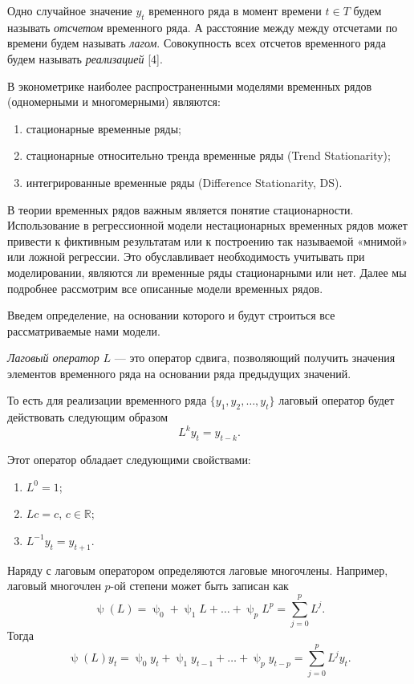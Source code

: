 \documentclass[a4paper, 14pt]{extreport}
\numberwithin{equation}{subsection}
\newcommand{\Rm}{\mathbb{R}}
\renewcommand{\psi}{\uppsi}
\numberwithin{equation}{section}
\begin{document}
	Одно случайное значение $y_t$ временного ряда в момент времени $t \in T$ будем называть \textit{отсчетом} временного ряда. А расстояние между между отсчетами по времени будем называть \textit{лагом}. Совокупность всех отсчетов временного ряда будем называть \textit{реализацией} [4].
	
	В эконометрике наиболее распространенными моделями временных рядов (одномерными и многомерными) являются:
	\begin{enumerate}
		\item стационарные временные ряды;
		\item стационарные относительно тренда временные ряды (Trend Stationarity);
		\item интегрированные временные ряды (Difference Stationarity, DS).
	\end{enumerate}
	
	В теории временных рядов важным является понятие стационарности. Использование в регрессионной модели нестационарных временных рядов
	может привести к фиктивным результатам или к построению так называемой
	«мнимой» или ложной регрессии. Это обуславливает
	необходимость учитывать при моделировании, являются ли временные ряды
	стационарными или нет. Далее мы подробнее рассмотрим все описанные модели временных рядов.
	
	Введем определение, на основании которого и будут строиться все рассматриваемые нами модели.
	
	\textit{Лаговый оператор}  $L$ --- это оператор сдвига, позволяющий получить значения элементов временного ряда на основании ряда предыдущих значений.
	
	То есть для реализации временного ряда $\{y_1, y_2,\ldots, y_t\}$ лаговый оператор будет действовать следующим образом 
	\begin{equation}
		L^k y_t = y_{t-k}.
	\end{equation}
	
	Этот оператор обладает следующими свойствами:
	\begin{enumerate}
		\item $L^0 = 1$;
		\item $Lc = c$, $c \in \Rm$;
		\item $L^{-1} y_t = y_{t+1}$.
	\end{enumerate}
	
	Наряду с лаговым оператором определяются лаговые многочлены. Например, лаговый многочлен $p$-ой степени может быть записан как
	\begin{equation}
		\psi(L) = \psi_0 + \psi_1 L + \ldots + \psi_pL^p = \sum_{j = 0}^{p}L^j.
	\end{equation}
	Тогда 
	\begin{equation}
		\psi(L)y_t = \psi_0 y_t + \psi_1 y_{t-1} + \ldots + \psi_p y_{t-p} = \sum_{j=0}^p L^j y_t.
	\end{equation}
	
\end{document}
